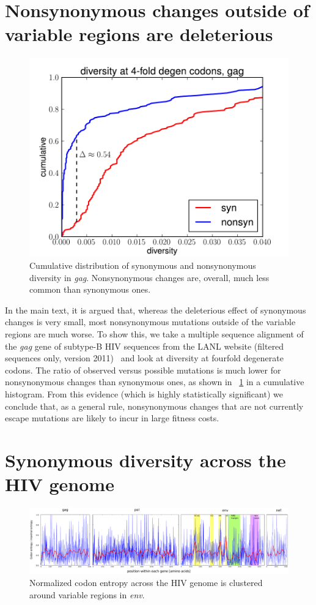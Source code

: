 \documentclass[rmp]{revtex4}
\begin{document}
\section{Nonsynonymous changes outside of variable regions are deleterious}
\begin{figure}[h]
\begin{center}
\includegraphics[width=0.5\linewidth]{synmut_conservation_4fold_synnonsyn}
\caption{Cumulative distribution of synonymous and nonsynonymous diversity in
{\it gag}. Nonsynonymous changes are, overall, much less common than synonymous
ones.}
\label{fig:synnonsyncons}
\end{center}
\end{figure}
In the main text, it is argued that, whereas the deleterious effect of
synonymous changes is very small, most nonsynonymous mutations outside of the
variable regions are much worse. To show this, we take a multiple sequence alignment of
the {\it gag} gene of subtype-B HIV sequences from the LANL website (filtered
sequences only, version 2011)~\cite{LANL2012} and look at diversity at fourfold degenerate
codons. The ratio of observed versus possible mutations is much lower for
nonsynonymous changes than synonymous ones, as shown in
\figurename~\ref{fig:synnonsyncons} in a cumulative histogram. From this
evidence (which is highly statistically significant) we conclude that, as a
general rule, nonsynonymous changes that are not currently escape mutations
are likely to incur in large fitness costs.

\section{Synonymous diversity across the HIV genome}
\begin{figure}[h]
\begin{center}
\includegraphics[width=\linewidth]{conservation_codons_genome}
\caption{Normalized codon entropy across the HIV genome is clustered around
variable regions in {\it env}.}
\label{fig:syndiv_genome}
\end{center}
\end{figure}
\end{document}
